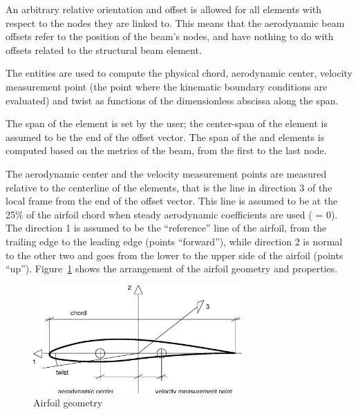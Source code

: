 An arbitrary relative orientation and offset is allowed for all elements with
respect to the nodes they are linked to. 
This means that the aerodynamic beam offsets refer to the position
of the beam's nodes, and have nothing to do with offsets related
to the structural beam element.

The  entities are used to compute the physical chord,
aerodynamic center, velocity measurement point (the point where the
kinematic boundary conditions are evaluated) and twist as functions 
of the dimensionless abscissa along the span.

The span of the  element is set by the user;
the center-span of the element is assumed to be the end of the offset vector.
The span of the  and  elements
is computed based on the metrics of the beam, from the first to the last node.

The aerodynamic center and the velocity measurement points are measured
relative to the centerline of the elements, that is the line in direction 3
of the local frame from the end of the offset vector.
This line is assumed to be at the 25\% of the airfoil chord when steady
aerodynamic coefficients are used ( = 0).
The direction 1 is assumed to be the ``reference'' line of the airfoil, 
from the trailing edge to the leading edge (points ``forward''),
while direction 2 is normal to the other two and goes from the lower 
to the upper side of the airfoil (points ``up''). 
Figure~\ref{fig:AIRFOIL} shows the arrangement of the airfoil geometry 
and properties.

\begin{figure}[h]
  \centering
    \includegraphics[width=80mm]{airfoil.eps}
  \caption{Airfoil geometry}\label{fig:AIRFOIL}
\end{figure}

